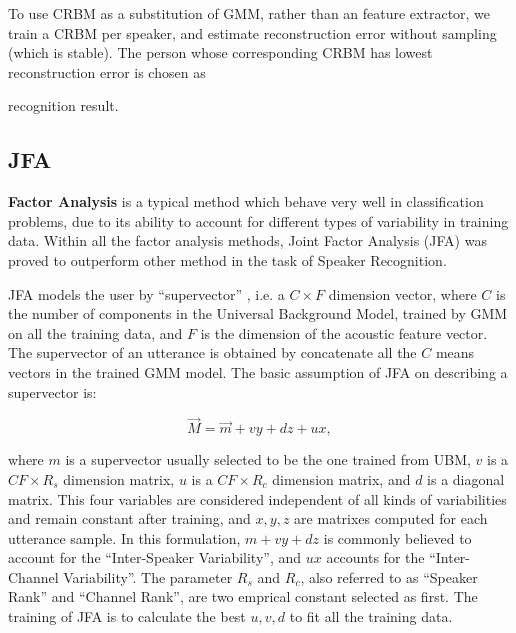 To use CRBM as a substitution of GMM, rather than
an feature extractor, we train a CRBM per speaker,
and estimate reconstruction error without sampling (which is stable).
The person whose corresponding CRBM has lowest reconstruction error is chosen as

recognition result.

\subsection{JFA}

\textbf{Factor Analysis} is a typical method which behave
very well in classification problems, due to its ability to
account for different types of variability in training data.
Within all the factor analysis methods,
Joint Factor Analysis (JFA)\cite{jfa2,jfa-se} was proved to outperform other method
in the task of Speaker Recognition.

JFA models the user by ``supervector'' , i.e. a $C\times F $ dimension vector, where $C$ is
the number of components in the Universal Background Model, trained by GMM on all the training data,
and $ F$ is the dimension of the acoustic feature vector. The supervector of an utterance is obtained by concatenate
all the $C $ means vectors in the trained GMM model. The basic assumption of JFA on describing a supervector is:

\[ \vec{M} = \vec{ m } + vy + dz + ux, \]

where $m$ is a supervector usually selected to be the one trained from UBM, $v$ is a $ CF \times R_s$ dimension matrix,
$ u$ is a $ CF \times R_c$ dimension matrix, and $d$ is a diagonal matrix.
This four variables are considered independent of all kinds of variabilities and remain constant after training, and
$x, y, z $ are matrixes computed for each utterance sample.
In this formulation, $ m + vy + dz$ is commonly believed to account for the ``Inter-Speaker Variability'', and $ux $ accounts
for the ``Inter-Channel Variability''.
The parameter $ R_s $ and $ R_c$, also referred to as ``Speaker Rank'' and ``Channel Rank'', are two emprical constant selected as first.
The training of JFA is to calculate the best $ u, v, d$ to fit all the training data.

